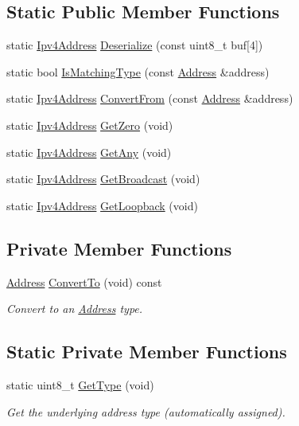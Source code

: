 \subsection*{Static Public Member Functions}
\begin{DoxyCompactItemize}
\item 
static \hyperlink{classns3_1_1Ipv4Address}{Ipv4\+Address} \hyperlink{classns3_1_1Ipv4Address_ac6e205258d95465ce51c148e51590760}{Deserialize} (const uint8\+\_\+t buf\mbox{[}4\mbox{]})
\item 
static bool \hyperlink{classns3_1_1Ipv4Address_a7129db5e08739783b300976d28c0ced3}{Is\+Matching\+Type} (const \hyperlink{classns3_1_1Address}{Address} \&address)
\item 
static \hyperlink{classns3_1_1Ipv4Address}{Ipv4\+Address} \hyperlink{classns3_1_1Ipv4Address_a5fd4a8f0f7bb75e35dad3d401ef4cbc1}{Convert\+From} (const \hyperlink{classns3_1_1Address}{Address} \&address)
\item 
static \hyperlink{classns3_1_1Ipv4Address}{Ipv4\+Address} \hyperlink{classns3_1_1Ipv4Address_aeeb1c76b35d4ab612fda7bc51e99c5db}{Get\+Zero} (void)
\item 
static \hyperlink{classns3_1_1Ipv4Address}{Ipv4\+Address} \hyperlink{classns3_1_1Ipv4Address_a7a39b330c8e701183a411d5779fca1a4}{Get\+Any} (void)
\item 
static \hyperlink{classns3_1_1Ipv4Address}{Ipv4\+Address} \hyperlink{classns3_1_1Ipv4Address_a548e1456ecb8d7d9456e54dacf0e5c7d}{Get\+Broadcast} (void)
\item 
static \hyperlink{classns3_1_1Ipv4Address}{Ipv4\+Address} \hyperlink{classns3_1_1Ipv4Address_a583a93499e0d947439794d7bd0c6366d}{Get\+Loopback} (void)
\end{DoxyCompactItemize}
\subsection*{Private Member Functions}
\begin{DoxyCompactItemize}
\item 
\hyperlink{classns3_1_1Address}{Address} \hyperlink{classns3_1_1Ipv4Address_a3eeb1856daf343d08c7f3cb9e116722e}{Convert\+To} (void) const 
\begin{DoxyCompactList}\small\item\em Convert to an \hyperlink{classns3_1_1Address}{Address} type. \end{DoxyCompactList}\end{DoxyCompactItemize}
\subsection*{Static Private Member Functions}
\begin{DoxyCompactItemize}
\item 
static uint8\+\_\+t \hyperlink{classns3_1_1Ipv4Address_a2553c778aff2c45c06f03d520cf2a102}{Get\+Type} (void)
\begin{DoxyCompactList}\small\item\em Get the underlying address type (automatically assigned). \end{DoxyCompactList}\end{DoxyCompactItemize}
